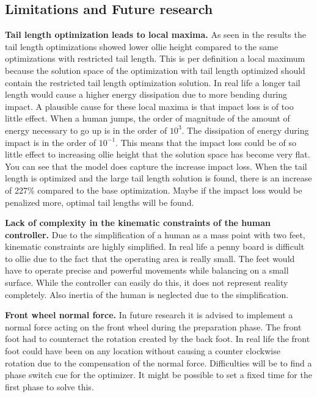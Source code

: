 \documentclass[default,iicol]{sn-jnl}
\begin{document}
{\subsection{Limitations and Future research}
\noindent\textbf{Tail length optimization leads to local maxima.} As seen in the results the tail length optimizations showed lower ollie height compared to the same optimizations with restricted tail length. This is per definition a local maximum because the solution space of the optimization with tail length optimized should contain the restricted tail length optimization solution. In real life a longer tail length would cause a higher energy dissipation due to more bending during impact. A plausible cause for these local maxima is that impact loss is of too little effect. When a human jumps, the order of magnitude of the amount of energy necessary to go up is in the order of $10^3$. The dissipation of energy during impact is in the order of $10^{-1}$. This means that the impact loss could be of so little effect to increasing ollie height that the solution space has become very flat. You can see that the model does capture the increase impact loss. When the tail length is optimized and the large tail length solution is found, there is an increase of 227\% compared to the base optimization. Maybe if the impact loss would be penalized more, optimal tail lengths will be found.
 
\noindent\textbf{Lack of complexity in the kinematic constraints of the human controller.} Due to the simplification of a human as a mass point with two feet, kinematic constraints are highly simplified. In real life a penny board is difficult to ollie due to the fact that the operating area is really small. The feet would have to operate precise and powerful movements while balancing on a small surface. While the controller can easily do this, it does not represent reality completely. Also inertia of the human is neglected due to the simplification.

\noindent\textbf{Front wheel normal force.} In future research it is advised to implement a normal force acting on the front wheel during the preparation phase. The front foot had to counteract the rotation created by the back foot. In real life the front foot could have been on any location without causing a counter clockwise rotation due to the compensation of the normal force. Difficulties will be to find a phase switch cue for the optimizer. It might be possible to set a fixed time for the first phase to solve this.

}
\end{document}
